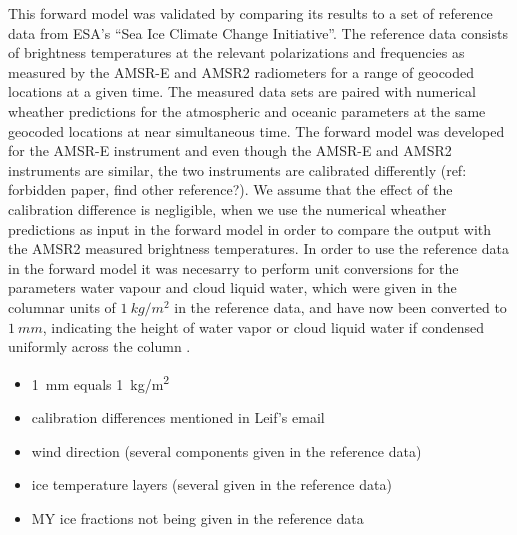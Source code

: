\documentclass[11pt, a4paper]{article}
\begin{document}
This forward model was validated by comparing its results to a set of reference data from ESA's ``Sea Ice Climate Change Initiative''. The reference data consists of brightness temperatures at the relevant polarizations and frequencies as measured by the AMSR-E and AMSR2 radiometers for a range of geocoded locations at a given time. The measured data sets are paired with numerical wheather predictions for the atmospheric and oceanic parameters at the same geocoded locations at near simultaneous time. \newline
The forward model was developed for the AMSR-E instrument and even though the AMSR-E and AMSR2 instruments are similar, the two instruments are calibrated differently (ref: forbidden paper, find other reference?). We assume that the effect of the calibration difference is negligible, when we use the numerical wheather predictions as input in the forward model in order to compare the output with the AMSR2 measured brightness temperatures. \newline
In order to use the reference data in the forward model it was necesarry to perform unit conversions for the parameters water vapour and cloud liquid water, which were given in the columnar units of $\SI{1}{kg/m^2}$ in the reference data, and have now been converted to $\SI{1}{mm}$, indicating the height of water vapor or cloud liquid water if condensed uniformly across the column \cite{remss}. \newline


\begin{itemize}
\item \SI{1}{mm} equals \SI{1}{kg/m^2}
\item calibration differences mentioned in Leif's email
\item wind direction (several components given in the reference data)
\item ice temperature layers (several given in the reference data)
\item MY ice fractions not being given in the reference data
\end{itemize}
\end{document}
